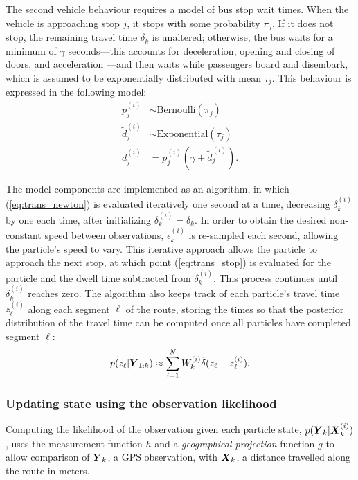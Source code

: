 The second vehicle behaviour requires a model of bus stop wait times.
When the vehicle is approaching stop $j$,
it stops with some probability $\pi_j$.
If it does not stop, the remaining travel time $\delta_k$ is unaltered;
otherwise, the bus waits for a minimum of $\gamma$ seconds---this 
accounts for deceleration, opening and closing of doors, and acceleration
\citep{Hans_2015}---and then waits while passengers board and disembark,
which is assumed to be exponentially distributed with mean $\tau_j$.
This behaviour is expressed in the following model:
\begin{equation}
\label{eq:trans_stop}
\begin{split}
p_j^{(i)} &\sim \mathrm{Bernoulli}(\pi_j) \\
\tilde d_j^{(i)} &\sim \mathrm{Exponential}(\tau_j) \\
d_j^{(i)} &= p_j^{(i)}(\gamma + \tilde d_j^{(i)}).
\end{split}
\end{equation}


The model components are implemented as an algorithm,
in which (\ref{eq:trans_newton}) is evaluated iteratively one second at a time,
decreasing $\delta_k^{(i)}$ by one each time,
after initializing $\delta_k^{(i)} = \delta_k$.
In order to obtain the desired non-constant speed between observations,
$\epsilon_k^{(i)}$ is re-sampled each second,
allowing the particle's speed to vary.
This iterative approach allows the particle to approach the next stop,
at which point (\ref{eq:trans_stop}) is evaluated for the particle
and the dwell time subtracted from $\delta_k^{(i)}$.
This process continues until $\delta_k^{(i)}$ reaches zero.
The algorithm also keeps track of each particle's travel time $z_\ell^{(i)}$
along each segment $\ell$ of the route,
storing the times so that the posterior distribution of the travel time
can be computed once all particles have completed segment $\ell$:
\begin{equation}
\label{eq:post_tt}
p(z_\ell | \mbox{$\boldsymbol{Y}$}_{1:k}) \approx
    \sum_{i=1}^N W_k^{(i)} \dot\delta(z_\ell - z_\ell^{(i)}).
\end{equation}



\subsubsection{Updating state using the observation likelihood}
\label{sec:pf_update}

Computing the likelihood of the observation given each particle state,
$p(\mbox{$\boldsymbol{Y}$}_k|\mbox{$\boldsymbol{X}$}_k^{(i)})$,
uses the measurement function $h$ and 
a \emph{geographical projection} function $g$ to allow comparison of $\mbox{$\boldsymbol{Y}$}_k$,
a GPS observation, with $\mbox{$\boldsymbol{X}$}_k$, a distance travelled along the route in meters.

